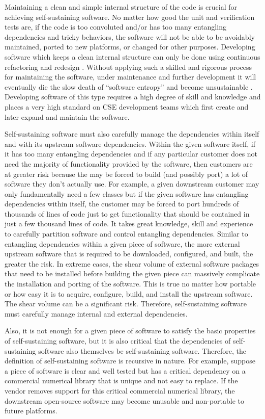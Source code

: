 \documentclass[11pt]{SANDreport}
\begin{document}
Maintaining a clean and simple internal structure of the code is
crucial for achieving self-sustaining software.  No matter how good
the unit and verification tests are, if the code is too convoluted
and/or has too many entangling dependencies and tricky behaviors, the
software will not be able to be avoidably maintained, ported to new
platforms, or changed for other purposes.  Developing software which
keeps a clean internal structure can only be done using continuous
refactoring and redesign {}\cite{XP2}.  Without applying such a
skilled and rigorous process for maintaining the software, under
maintenance and further development it will eventually die the slow
death of ``software entropy'' and become unsustainable
{}\cite{MythicalManMonth95}.  Developing software of this type
requires a high degree of skill and knowledge and places a very high
standard on CSE development teams which first create and later expand
and maintain the software.

Self-sustaining software must also carefully manage the dependencies
within itself and with its upstream software dependencies.  Within the
given software itself, if it has too many entangling dependencies and
if any particular customer does not need the majority of functionality
provided by the software, then customers are at greater risk because
the may be forced to build (and possibly port) a lot of software they
don't actually use.  For example, a given downstream customer may only
fundamentally need a few classes but if the given software has
entangling dependencies within itself, the customer may be forced to
port hundreds of thousands of lines of code just to get functionality
that should be contained in just a few thousand lines of code.  It
takes great knowledge, skill and experience to carefully partition
software and control entangling dependencies.  Similar to entangling
dependencies within a given piece of software, the more external
upstream software that is required to be downloaded, configured, and
built, the greater the risk.  In extreme cases, the shear volume of
external software packages that need to be installed before building
the given piece can massively complicate the installation and porting
of the software.  This is true no matter how portable or how easy it
is to acquire, configure, build, and install the upstream software.
The shear volume can be a significant risk.  Therefore,
self-sustaining software must carefully manage internal and external
dependencies.

Also, it is not enough for a given piece of software to satisfy the
basic properties of self-sustaining software, but it is also critical
that the dependencies of self-sustaining software also themselves be
self-sustaining software. Therefore, the definition of self-sustaining
software is recursive in nature.  For example, suppose a piece of
software is clear and well tested but has a critical dependency on a
commercial numerical library that is unique and not easy to replace.
If the vendor removes support for this critical commercial numerical
library, the downstream open-source software may become unusable and
non-portable to future platforms.
\end{document}

